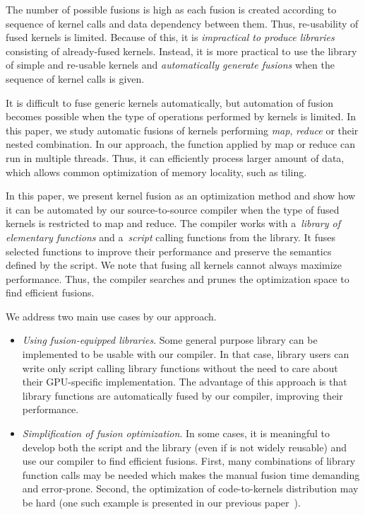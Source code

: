 \documentclass[final]{siamltex}
\begin{document}
The number of possible fusions is high as each fusion is created according to sequence of kernel calls and data dependency between them. Thus,  re-usability of fused kernels is limited.
Because of this, it is \textit{impractical to produce libraries} consisting of already-fused kernels. Instead, it is more practical to use the library of simple and re-usable kernels and \textit{automatically generate fusions} when the sequence of kernel calls is given. 

It is difficult to fuse generic kernels automatically, but automation of fusion becomes possible when the type of operations performed by kernels is limited. In this paper, we study automatic fusions of kernels performing \textit{map}, \textit{reduce} or their nested combination. In our approach, the function applied by map or reduce can run in multiple threads. Thus, it can efficiently process larger amount of data, which allows common optimization of memory locality, such as tiling.


In this paper, we present kernel fusion as an optimization method and show how it can be automated by our source-to-source compiler when the type of fused kernels is restricted to map and reduce. The compiler works with a~\textit{library of elementary functions} and a~\textit{script} calling functions from the library. It fuses selected functions to improve their performance and preserve the semantics defined by the script.  We note that fusing all kernels cannot always maximize performance. Thus, the compiler searches and prunes the optimization space to find efficient fusions.

We address two main use cases by our approach.
\begin{itemize}
        \item \textit{Using fusion-equipped libraries}. Some general purpose library can be implemented to be usable with our compiler. In that case, library users can write only script calling library functions without the need to care about their GPU-specific implementation. The advantage of this approach is that library functions are automatically fused by our compiler, improving their performance. \item \textit{Simplification of fusion optimization}. In some cases, it is meaningful to develop both the script and the library (even if is not widely reusable) and use our compiler to find efficient fusions. First, many combinations of library function calls may be needed which makes the manual fusion time demanding and error-prone. Second, the optimization of code-to-kernels distribution may be hard (one such example is presented in our previous paper~\cite{filipovic2012automatically}).\end{itemize}
\end{document}
